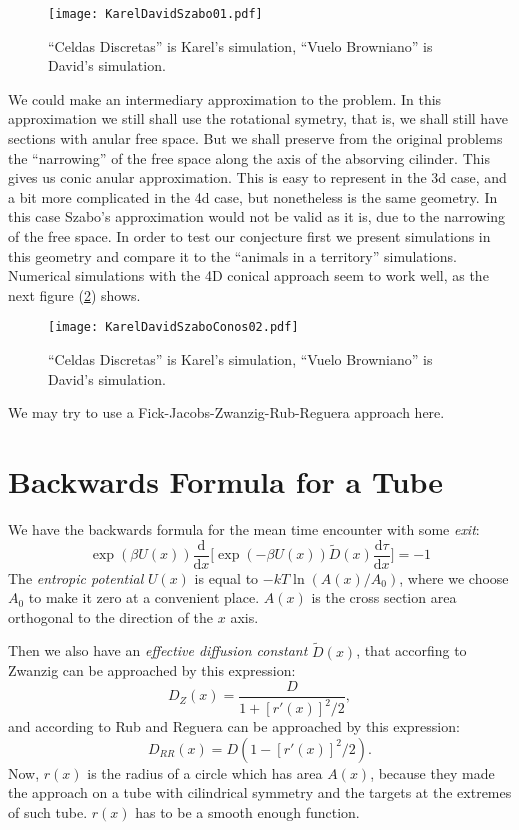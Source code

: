 \documentclass[letterpaperr,12pt]{article}
\newcommand{\rd}{\!\mathrm{d}}
\begin{document}
\begin{figure}[h]
  \centering
  \texttt{[image: KarelDavidSzabo01.pdf]}
  \caption{``Celdas Discretas'' is Karel's simulation, ``Vuelo Browniano'' is
    David's simulation.}\label{KDS01}
\end{figure}

We could make an intermediary approximation to the problem.
In this approximation we still shall use the rotational symetry, that
is, we shall still have sections with anular free space. But we shall preserve
from the original problems the ``narrowing'' of the free space along
the axis of the absorving cilinder. This gives us  
conic anular approximation. This is easy to represent in the 3d case, and
a bit more complicated in the 4d case, but nonetheless is the same
geometry. In this case Szabo's approximation would not be valid as it is, 
due to the narrowing of the free space. In order to test our conjecture
first we present simulations in this geometry and compare it to 
the ``animals in a territory'' simulations. 
Numerical simulations with the 4D conical approach seem to work well,
as the next figure (\ref{KDS02}) shows.

\begin{figure}[h]
  \centering
  \texttt{[image: KarelDavidSzaboConos02.pdf]}
  \caption{``Celdas Discretas'' is Karel's simulation, ``Vuelo Browniano'' is
    David's simulation.}\label{KDS02}
\end{figure}

We may try to use a Fick-Jacobs-Zwanzig-Rub-Reguera approach here.

\section{Backwards Formula for a Tube}

We have the backwards formula for the mean time encounter
with some \emph{exit}:
\begin{equation}\label{backwarde}
\exp(\beta U(x))
\frac{\rd}{\rd x}
\biggr[\exp (-\beta U(x)) \tilde{D}(x) \frac{\rd \tau}{\rd x} \biggr]=-1 
\end{equation}
The \emph{entropic potential} $U(x)$ is equal to  $-kT \ln (A(x)/A_0)$,
where we choose $A_0$ to make it zero at a convenient place. 
$A(x)$ is the cross section area orthogonal to the direction of the $x$ axis.

Then we also have an \emph{effective diffusion constant} $\tilde{D}(x)$,
that accorfing to Zwanzig can be approached by this expression:
\begin{equation}\label{DZ}
D_Z(x)=\frac{D}{1+[r'(x)]^2/2},
\end{equation}
and according to Rub and Reguera
can be approached by this expression:
\begin{equation}\label{DZ}
D_{RR}(x)=D(1-[r'(x)]^2/2).
\end{equation}
Now, $r(x)$ is the radius of a circle which has area $A(x)$, because they
made the approach on a tube with cilindrical symmetry and the targets at the
extremes of such tube. $r(x)$ has to be a smooth enough function.
\end{document}
